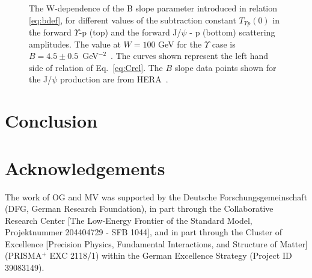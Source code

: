 \documentclass[10pt,prd,aps,nofootinbib,superscriptaddress]{revtex4}
\begin{document}
\begin{figure}
\caption{
The W-dependence of the B slope parameter introduced in relation \ref{eq:bdef},
for different values of the subtraction constant $T_{\Upsilon p} (0)$ in the forward $\Upsilon$-p (top)
and the forward J/$\psi$ - p (bottom) scattering amplitudes.
The value at $W=100$ GeV for the $\Upsilon$ case is $B=4.5\pm0.5$~GeV$^{-2}$~\cite{Chekanov:2009zz}.
The curves shown represent the left hand side of relation of Eq.~\ref{eq:Crel}.
The $B$ slope data points shown for the J/$\psi$ production are from HERA~\cite{Chekanov:2002xi}.
}
\label{fig:bslope}
\end{figure}

\section{Conclusion}

\section*{Acknowledgements}
The work of OG and MV was supported by the Deutsche Forschungsgemeinschaft (DFG, German Research Foundation),
in part through the Collaborative Research Center [The Low-Energy Frontier of the Standard
Model, Projektnummer 204404729 - SFB 1044], and in part through the Cluster of Excellence
[Precision Physics, Fundamental Interactions, and Structure of Matter] (PRISMA$^+$ EXC
2118/1) within the German Excellence Strategy (Project ID 39083149).
\end{document}
